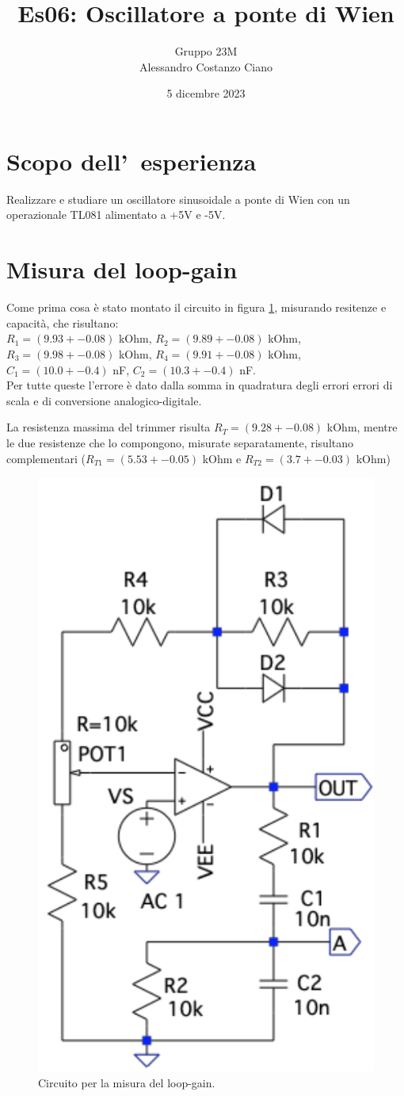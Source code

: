 \documentclass[10pt,a4paper]{article}
\author{Gruppo 23M \\ Alessandro Costanzo Ciano}
\title{Es06: Oscillatore a ponte di Wien}
\begin{document}
\date{5 dicembre 2023}
\maketitle


\section*{Scopo dell'~esperienza}
Realizzare e studiare un oscillatore sinusoidale a ponte di Wien con un operazionale TL081 alimentato a +5V e -5V.
%
%

\section{Misura del loop-gain}

Come prima cosa è stato montato il circuito in figura \ref{fig:circuitoloopgain}, misurando resitenze e capacità, che risultano: \\
$R_1 = (9.93+-0.08)$ kOhm, $R_2 = (9.89+-0.08)$ kOhm, $R_3 = (9.98+-0.08)$ kOhm, $R_4 = (9.91+-0.08)$ kOhm, $C_1 = (10.0+-0.4)$ nF, $C_2 = (10.3+-0.4)$ nF.\\
Per tutte queste l'errore è dato dalla somma in quadratura degli errori errori di scala e di conversione analogico-digitale.

La resistenza massima del trimmer risulta $R_T =  (9.28+-0.08)$ kOhm, mentre le due resistenze che lo compongono, misurate separatamente, risultano complementari ($R_{T1} =  (5.53+-0.05)$ kOhm e $R_{T2} =  (3.7+-0.03)$ kOhm)

\begin{figure}[h]
    \begin{center}
    \includegraphics[width=0.4\linewidth]{circuitoloopgain.png}
    \caption{\small Circuito per la misura del loop-gain.}
    \label{fig:circuitoloopgain}
    \end{center}
\end{figure}
\end{document}
